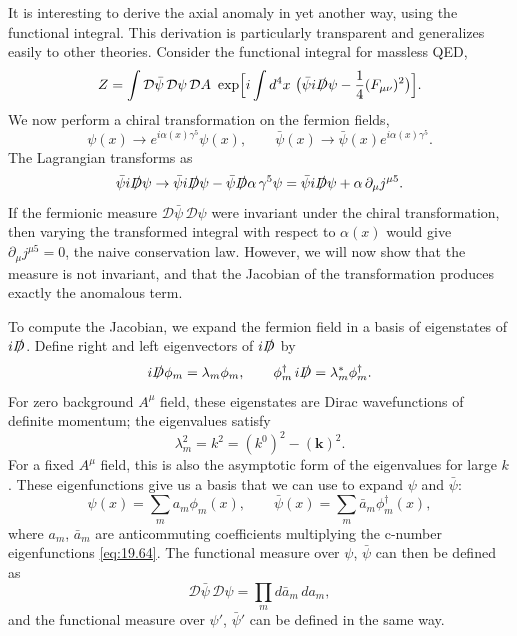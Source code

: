It is interesting to derive the axial anomaly in yet another way, using the
functional integral.  This derivation is particularly transparent and
generalizes easily to other theories.  Consider the functional integral for
massless QED,
\begin{equation}
  Z = \int \mathcal{D}\bar{\psi}\,\mathcal{D}\psi\,\mathcal{D}A\ \exp\Bigl[
    i\int d^4x\ \bigl( \bar{\psi}i\slashed{D}\psi
      - \frac{1}{4}(F_{\mu\nu})^2 \bigr) \Bigr] .
  \label{eq:19.61}
\end{equation}
We now perform a chiral transformation on the fermion fields,
\begin{equation}
  \psi(x) \to e^{i\alpha(x)\gamma^5}\psi(x),\qquad
  \bar{\psi}(x) \to \bar{\psi}(x)e^{i\alpha(x)\gamma^5} .
  \label{eq:19.62}
\end{equation}
The Lagrangian transforms as
\begin{equation}
  \bar{\psi}i\slashed{D}\psi \to \bar{\psi}i\slashed{D}\psi
    - \bar{\psi}\slashed{D}\alpha\,\gamma^5\psi
    = \bar{\psi}i\slashed{D}\psi + \alpha\,\partial_\mu j^{\mu 5} .
  \label{eq:19.63}
\end{equation}
If the fermionic measure $\mathcal{D}\bar{\psi}\,\mathcal{D}\psi$ were
invariant under the chiral transformation, then varying the transformed
integral with respect to $\alpha(x)$ would give $\partial_\mu j^{\mu 5} = 0$,
the naive conservation law.  However, we will now show that the measure is
not invariant, and that the Jacobian of the transformation produces exactly
the anomalous term.

To compute the Jacobian, we expand the fermion field in a basis of
eigenstates of $i\slashed{D}$.  Define right and left eigenvectors of
$i\slashed{D}$ by
\begin{equation}
  i\slashed{D}\phi_m = \lambda_m\phi_m,\qquad
  \phi^{\dagger}_m\,i\slashed{D} = \lambda^{*}_m\phi^{\dagger}_m .
  \label{eq:19.64}
\end{equation}
For zero background $A^\mu$ field, these eigenstates are Dirac wavefunctions
of definite momentum; the eigenvalues satisfy
\begin{equation}
  \lambda^2_m = k^2 = (k^0)^2 - (\mathbf{k})^2 .
  \label{eq:19.65}
\end{equation}
For a fixed $A^\mu$ field, this is also the asymptotic form of the eigenvalues
for large $k$.  These eigenfunctions give us a basis that we can use to expand
$\psi$ and $\bar{\psi}$:
\begin{equation}
  \psi(x) = \sum_m a_m\phi_m(x),\qquad
  \bar{\psi}(x) = \sum_m \bar{a}_m\phi^{\dagger}_m(x) ,
  \label{eq:19.66}
\end{equation}
where $a_m$, $\bar{a}_m$ are anticommuting coefficients multiplying the
c-number eigenfunctions \eqref{eq:19.64}.  The functional measure over
$\psi$, $\bar{\psi}$ can then be defined as
\begin{equation}
  \mathcal{D}\bar{\psi}\,\mathcal{D}\psi = \prod_m d\bar{a}_m\,da_m ,
  \label{eq:19.67}
\end{equation}
and the functional measure over $\psi'$, $\bar{\psi}'$ can be defined in the
same way.


